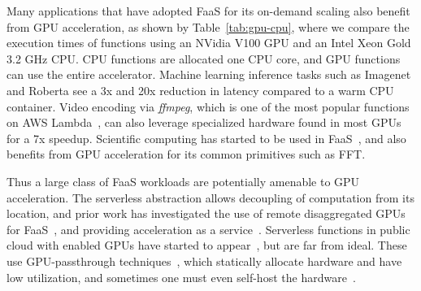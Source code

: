 

Many applications that have adopted FaaS for its on-demand scaling also benefit from GPU acceleration, as shown by Table~\ref{tab:gpu-cpu}, where we compare the execution times of functions using an NVidia V100 GPU and an Intel Xeon Gold 3.2 GHz CPU.
CPU functions are allocated one CPU core, and GPU functions can use the entire accelerator.
Machine learning inference tasks such as Imagenet and Roberta see a 3x and 20x reduction in latency compared to a warm CPU container. 
Video encoding via \emph{ffmpeg}, which is one of the most popular functions on AWS Lambda~\cite{aws-netflix}, can also leverage specialized hardware found in most GPUs for a 7x speedup. 
Scientific computing has started to be used in FaaS~\cite{john_sweep_2019,mocskos_faaster_2018,werner2018serverless,shankar2020serverless}, and also benefits from GPU acceleration for its common primitives such as FFT.


Thus a large class of FaaS workloads are potentially amenable to GPU acceleration.
The serverless abstraction allows decoupling of computation from its location, and prior work has investigated the use of remote disaggregated GPUs for FaaS~\cite{naranjo2020accelerated,fingler2022dgsf}, and providing acceleration as a service~\cite{varghese2015acceleration,du2022serverless}.
Serverless functions in public cloud with enabled GPUs have started to appear~\cite{azure-gpu-function,alibaba-gpu-function}, but are far from ideal.
These use GPU-passthrough techniques~\cite{alibaba-gpu-noshare}, which statically allocate hardware and have low utilization, and sometimes one must even self-host the hardware~\cite{azure-gpu-function}.

